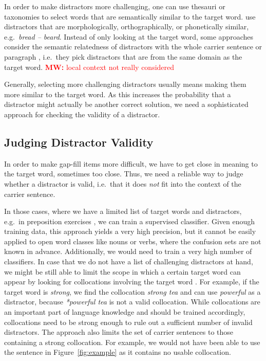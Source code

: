 \documentclass[11pt,letterpaper]{article}
\newcommand{\mw}[1]{\textcolor{red}{\textbf{MW:} #1}}
\newcommand{\mw}[1]{}
\begin{document}
In order to make distractors more challenging, one can use thesauri \cite{Sumita2005,Smith2010} or taxonomies \cite{Hoshino2007,Mitkov2009} to select words that are semantically similar to the target word.
 use distractors that are morphologically, orthographically, or phonetically similar, e.g.\ \emph{bread -- beard}.
Instead of only looking at the target word, some approaches consider the semantic relatedness of distractors with the whole carrier sentence or paragraph \cite{Pino2008,Agarwal2011,Mostow2012}, i.e.\ they pick distractors that are from the same domain as the target word. \mw{local context not really considered}

Generally, selecting more challenging distractors usually means making them more similar to the target word.
As this increases the probability that a distractor might actually be another correct solution, we need a sophisticated approach for checking the validity of a distractor.

\subsection{Judging Distractor Validity}
In order to make gap-fill items more difficult, we have to get close in meaning to the target word, sometimes too close.
Thus, we need a reliable way to judge whether a distractor is valid, i.e.\ that it does \emph{not} fit into the context of the carrier sentence.

In those cases, where we have a limited list of target words and distractors, e.g.\ in preposition exercises \cite{Lee2007}, we can train a supervised classifier.
Given enough training data, this approach yields a very high precision, but it cannot be easily applied to open word classes like nouns or verbs, where the confusion sets are not known in advance.
Additionally, we would need to train a very high number of classifiers. 
In case that we do not have a list of challenging distractors at hand, we might be still able to limit the scope in which a certain target word can appear by looking for collocations involving the target word \cite{Pino2008,Smith2010}.
For example, if the target word is \emph{strong}, we find the collocation \emph{strong tea} and can use \emph{powerful} as a distractor, because \emph{*powerful tea} is not a valid collocation.
While collocations are an important part of language knowledge and should be trained accordingly, collocations need to be strong enough to rule out a sufficient number of invalid distractors.
The approach also limits the set of carrier sentences to those containing a strong collocation.
For example, we would not have been able to use the sentence in Figure~\ref{fig:example} as it contains no usable collocation.
\end{document}
